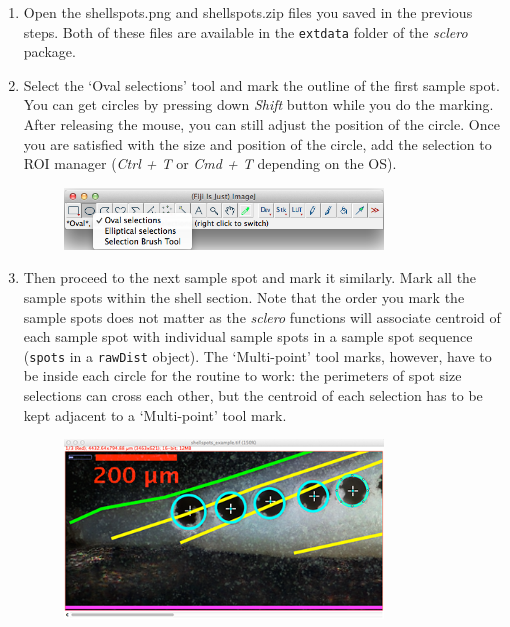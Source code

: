 \documentclass[11pt, a4paper]{article}
\newcommand{\sclero}{\textit{sclero}\xspace}
\begin{document}
\begin{enumerate}
\item Open the shellspots.png and shellspots.zip files you saved in the previous steps. Both of these files are available in the \texttt{extdata} folder of the \sclero package.
\item Select the `Oval selections' tool and mark the outline of the first sample spot. You can get circles by pressing down \textit{Shift} button while you do the marking. After releasing the mouse, you can still adjust the position of the circle. Once you are satisfied with the size and position of the circle, add the selection to ROI manager (\textit{Ctrl + T} or \textit{Cmd + T} depending on the OS).
\begin{figure}[H]
\begin{center}
\includegraphics[width = 0.8\textwidth]{oval_selection.png}
\end{center}
\end{figure}
\item Then proceed to the next sample spot and mark it similarly. Mark all the sample spots within the shell section. Note that the order you mark the sample spots does not matter as the \sclero functions will associate centroid of each sample spot with individual sample spots in a sample spot sequence (\texttt{spots} in a \texttt{rawDist} object). The `Multi-point' tool marks, however, have to be inside each circle for the routine to work: the perimeters of spot size selections can cross each other, but the centroid of each selection has to be kept adjacent to a `Multi-point' tool mark.
\begin{figure}[H]
\begin{center}
\includegraphics[width = 0.8\textwidth]{adding_ovals.png}

\end{center}
\end{figure}
\end{enumerate}
\end{document}
